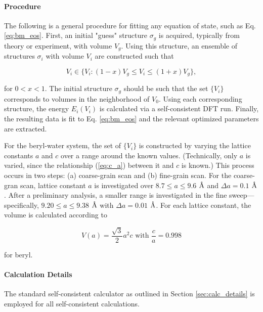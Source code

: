         \paragraph{Procedure} The following is a general procedure for fitting any equation of state, such as Eq. \ref{eq:bm_eos}. First, an initial "guess" structure $\sigma_g$ is acquired, typically from theory or experiment, with volume $V_g$. Using this structure, an ensemble of structures $\sigma_i$ with volume $V_i$ are constructed such that
        
        \begin{equation}
        \label{eq:ensem_eos}
            V_i \in \{ V_i : (1-x)V_g \le V_i \le (1+x) V_g \},
        \end{equation}
        
        \noindet for $0<x<1$. The initial structure $\sigma_g$ should be such that the set $\{V_i\}$ corresponds to volumes in the neighborhood of $V_0$. Using each corresponding structure, the energy $E_i(V_i)$ is calculated via a self-consistent DFT run. Finally, the resulting data is fit to Eq. \ref{eq:bm_eos} and the relevant optimized parameters are extracted.
        
        For the beryl-water system, the set of $\{ V_i\}$  is constructed by varying the lattice constants $a$ and $c$ over a range around the known values. (Technically, only $a$ is varied, since the relationship (\ref{eq:c_a}) between it and $c$ is known.) This process occurs in two steps: (a) coarse-grain scan and (b) fine-grain scan. For the coarse-gran scan, lattice constant $a$ is investigated over $8.7 \le a \le 9.6$ $\text{\normalfont\AA}$ and $\Delta a = 0.1$ $\text{\normalfont\AA}$. After a preliminary analysis, a smaller range is investigated in the fine sweep---specifically, $9.20 \le a \le 9.38$ $\text{\normalfont\AA}$ with $\Delta a=0.01$ $\text{\normalfont\AA}$. For each lattice constant, the volume is calculated according to 
            
        \begin{equation}
        \label{eq:c_a}
            V(a) = \frac{\sqrt{3}}{2} a^2 c \text{ with } \frac{c}{a} = 0.998
        \end{equation}
        
        \noindent for beryl.
        
        \paragraph{Calculation Details} The standard self-consistent calculator as outlined in Section \ref{sec:calc_details} is employed for all self-consistent calculations. 
            
